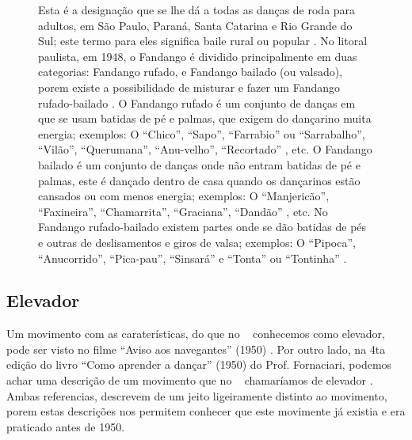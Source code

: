 \begin{figure}[t]
\begin{elaboracion}[title=Fandango]
Esta é a designação que se lhe dá a todas as danças de 
roda para adultos, em São Paulo, Paraná, Santa Catarina e Rio Grande do Sul;
este termo para eles significa baile rural ou popular \cite[pp. 261]{marcondes1977enciclopedia}.
No litoral paulista, em 1948, o Fandango é dividido principalmente em duas categorias: Fandango rufado, 
e Fandango bailado (ou valsado), porem existe a possibilidade de 
misturar e fazer um Fandango rufado-bailado \cite[pp. 48-49]{fandangoSP}.
O Fandango rufado é um conjunto de danças em que se usam batidas de pé e palmas, 
que exigem do dançarino muita energia; exemplos: O ``Chico'', ``Sapo'', 
``Farrabio'' ou ``Sarrabalho'', ``Vilão'', ``Querumana'', ``Anu-velho'', ``Recortado'' \cite[pp. 48-49]{fandangoSP}, 
etc.
O Fandango bailado é um conjunto de danças onde  não entram batidas de pé e palmas,
este é dançado dentro de casa quando os dançarinos estão cansados ou com menos energia;
exemplos: O ``Manjericão'', ``Faxineira'', ``Chamarrita'', ``Graciana'', ``Dandão'' \cite[pp. 49]{fandangoSP}, 
etc.
No Fandango rufado-bailado existem partes onde se dão batidas de pés e outras de deslisamentos e giros de valsa;
exemplos: O ``Pipoca'', ``Anucorrido'', ``Pica-pau'', ``Sinsará'' e ``Tonta'' ou ``Tontinha'' \cite[pp. 49]{fandangoSP}.
\end{elaboracion}
\label{fig:fandango}
\vspace{-20pt}
\end{figure}


\vspace{-10pt}
\subsection{Elevador}
\label{def:PassoElevador}

Um movimento com as caraterísticas, do que no \AnoLivro~ conhecemos como elevador, 
pode ser visto no filme ``Aviso aos navegantes'' (1950) \cite[min. 40:35]{AtlantidaDance}.
Por outro lado, na 4ta edição do livro ``Como aprender a dançar'' (1950) do Prof. Fornaciari,
podemos achar uma descrição de um movimento que no \AnoLivro~ chamaríamos de elevador \cite[pp. 161]{fornaciari1950aprender}.
Ambas referencias, descrevem de um jeito ligeiramente distinto ao movimento,
porem estas descrições nos permitem conhecer que este movimente já existia e era 
praticado antes de 1950.


